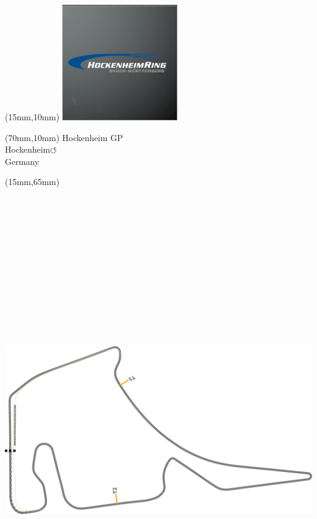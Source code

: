 \null\newpage
\begin{textblock*}{50mm}(15mm,10mm)%
\includegraphics[width=50mm]{LG/2015-05-20_00082.png}
\end{textblock*}
\begin{textblock*}{130mm}(70mm,10mm)%
{\fontsize{20}{20}\selectfont Hockenheim GP\\}
{\fontsize{16}{16}\selectfont Hockenheim\hfill \huge$\circlearrowleft$\\}
{\fontsize{12}{12}\selectfont Germany\\}
\end{textblock*}
\begin{textblock*}{185mm}(15mm,65mm)%
\centering
\mbox{\includegraphics[width=185mm,height=210mm,keepaspectratio]{PT/HOGP.pdf}}
\end{textblock*}
